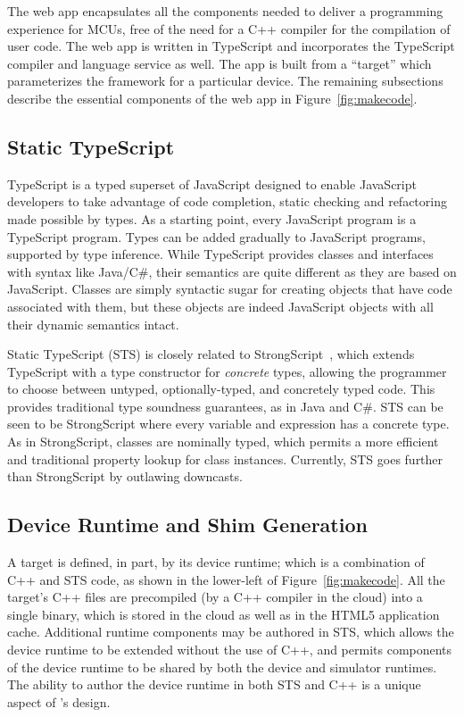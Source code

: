 The web app encapsulates all the components needed to deliver a programming experience for MCUs, free of the need for a C++ compiler for the compilation of user code. The web app is written in TypeScript and incorporates the TypeScript compiler and language service as well. The app is built from a \MC ``target'' which parameterizes the \MC framework for a particular device. The remaining subsections describe the essential components of the web app in Figure~\ref{fig:makecode}.

\subsection{Static TypeScript}

TypeScript is a typed superset of JavaScript designed to enable JavaScript developers to take advantage of code
completion, static checking and refactoring made possible by types.
As a starting point, every JavaScript program is a TypeScript program.  Types can be added gradually to
JavaScript programs, supported by type inference.
While TypeScript provides classes and interfaces with syntax like
Java/C\#, their semantics are quite different as they are based on JavaScript. Classes are simply syntactic sugar for creating objects that have code associated with them, but these objects are indeed
JavaScript objects with all their dynamic semantics intact.

Static TypeScript (STS) is closely related to Strong\-Script~\cite{StrongScriptECOOP15}, which extends TypeScript with a type constructor for \emph{concrete} types, allowing the programmer to choose between untyped, optionally-typed, and concretely typed code. This provides traditional type soundness guarantees, as in Java and C\#. STS can be seen to be StrongScript where every variable and expression has a concrete type. As in StrongScript, classes are nominally typed, which permits a more efficient and traditional property lookup for class instances. Currently, STS goes further than StrongScript by outlawing downcasts.

\subsection{Device Runtime and Shim Generation}
\label{sec:shim-gen}

A \MC target is defined, in part, by its device runtime; which is a combination of C++ and STS code, as shown in the lower-left of Figure~\ref{fig:makecode}. All the target's C++ files are precompiled (by a C++ compiler in the cloud) into a single binary, which is stored in the cloud as well as in the HTML5 application cache. Additional runtime components may be authored in STS, which allows the device runtime to be extended without the use of C++, and permits components of the device runtime to be shared by both the device and simulator runtimes. The ability to author the device runtime in both STS and C++ is a unique aspect of \MCN's design.

